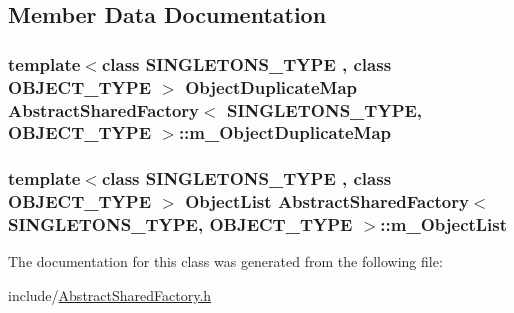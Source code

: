 \subsection{Member Data Documentation}
\hypertarget{class_abstract_shared_factory_a6640dd3209b932e973547cf9f7ecf758}{
\subsubsection[{m\+\_\+\+Object\+Duplicate\+Map}]{\setlength{\rightskip}{0pt plus 5cm}template$<$class S\+I\+N\+G\+L\+E\+T\+O\+N\+S\+\_\+\+T\+Y\+P\+E , class O\+B\+J\+E\+C\+T\+\_\+\+T\+Y\+P\+E $>$ Object\+Duplicate\+Map {\bf Abstract\+Shared\+Factory}$<$ S\+I\+N\+G\+L\+E\+T\+O\+N\+S\+\_\+\+T\+Y\+P\+E, O\+B\+J\+E\+C\+T\+\_\+\+T\+Y\+P\+E $>$\+::m\+\_\+\+Object\+Duplicate\+Map}}\label{class_abstract_shared_factory_a6640dd3209b932e973547cf9f7ecf758}
\hypertarget{class_abstract_shared_factory_adc52945f7c9e7d22a790168090164ae4}{
\subsubsection[{m\+\_\+\+Object\+List}]{\setlength{\rightskip}{0pt plus 5cm}template$<$class S\+I\+N\+G\+L\+E\+T\+O\+N\+S\+\_\+\+T\+Y\+P\+E , class O\+B\+J\+E\+C\+T\+\_\+\+T\+Y\+P\+E $>$ Object\+List {\bf Abstract\+Shared\+Factory}$<$ S\+I\+N\+G\+L\+E\+T\+O\+N\+S\+\_\+\+T\+Y\+P\+E, O\+B\+J\+E\+C\+T\+\_\+\+T\+Y\+P\+E $>$\+::m\+\_\+\+Object\+List}}\label{class_abstract_shared_factory_adc52945f7c9e7d22a790168090164ae4}


The documentation for this class was generated from the following file\+:\begin{DoxyCompactItemize}
\item 
include/\hyperlink{_abstract_shared_factory_8h}{Abstract\+Shared\+Factory.\+h}\end{DoxyCompactItemize}

